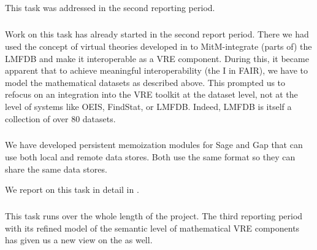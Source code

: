 \subparagraph{}
\label{dksbases@data-findstat}
This task was addressed in the second reporting period.
\medskip

\subparagraph{}
\label{dksbases@data-LMFDB}
Work on this task has already started in the second report period. There we had used the concept of virtual theories developed in  to MitM-integrate (parts of) the LMFDB and make it interoperable as a VRE component.
During this, it became apparent that to achieve meaningful interoperability (the I in FAIR), we have to model the mathematical datasets as described above.
This prompted us to refocus on an integration into the \pn VRE toolkit at the dataset level, not at the level of systems like OEIS, FindStat, or LMFDB.
Indeed, LMFDB is itself a collection of over 80 datasets.
\medskip

\subparagraph{}
\label{dksbases@data-memo}
We have developed persistent memoization modules for Sage and Gap that can use both local and remote data stores.
Both use the same format so they can share the same data stores.

We report on this task in detail in .
\medskip

\subparagraph{}
This task runs over the whole length of the \pn project. The third reporting period with its refined model of the semantic level of mathematical VRE components has given us a new view on the  as well.

